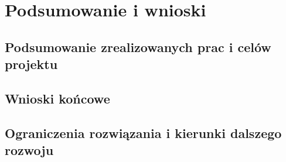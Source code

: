 \chapter{Podsumowanie i wnioski}\label{ch:podsumowanie}

\section{Podsumowanie zrealizowanych prac i celów projektu}\label{sec:podsumowanie-prac}

\section{Wnioski końcowe}\label{sec:wnioski}

\section{Ograniczenia rozwiązania i kierunki dalszego rozwoju}\label{sec:dalsze-prace}
